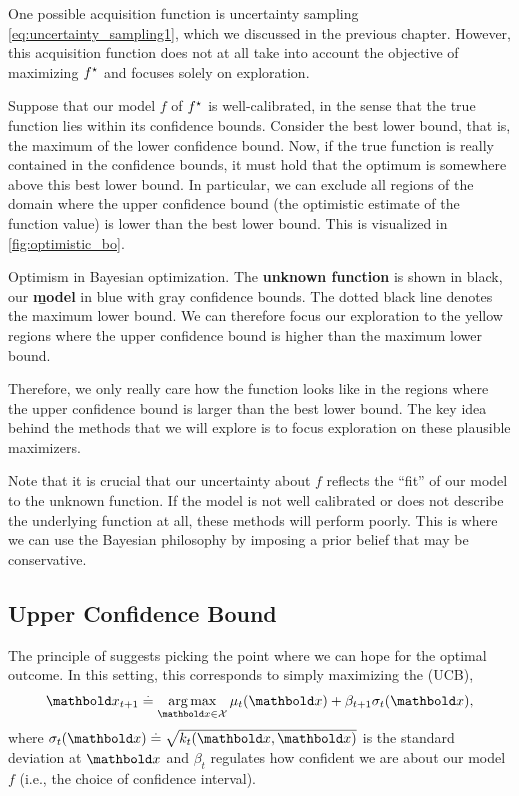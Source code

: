 One possible acquisition function is uncertainty sampling \eqref{eq:uncertainty_sampling1}, which we discussed in the previous chapter.
However, this acquisition function does not at all take into account the objective of maximizing $f^\star$ and focuses solely on exploration.

Suppose that our model $f$ of $f^\star$ is well-calibrated, in the sense that the true function lies within its confidence bounds.
Consider the best lower bound, that is, the maximum of the lower confidence bound.
Now, if the true function is really contained in the confidence bounds, it must hold that the optimum is somewhere above this best lower bound.
In particular, we can exclude all regions of the domain where the upper confidence bound (the optimistic estimate of the function value) is lower than the best lower bound.
This is visualized in \cref{fig:optimistic_bo}.

\begin{marginfigure}
  \caption{Optimism in Bayesian optimization.
  The \textbf{unknown function} is shown in black, our \textbf{\b{model}} in blue with gray confidence bounds.
  The dotted black line denotes the maximum lower bound.
  We can therefore focus our exploration to the yellow regions where the upper confidence bound is higher than the maximum lower bound.}\label{fig:optimistic_bo}
\end{marginfigure}

Therefore, we only really care how the function looks like in the regions where the upper confidence bound is larger than the best lower bound.
The key idea behind the methods that we will explore is to focus exploration on these plausible maximizers.

Note that it is crucial that our uncertainty about $f$ reflects the ``fit'' of our model to the unknown function.
If the model is not well calibrated or does not describe the underlying function at all, these methods will perform poorly.
This is where we can use the Bayesian philosophy by imposing a prior belief that may be conservative.

\subsection{Upper Confidence Bound}\label{sec:bayesian_optimization:acquisition_functions:ucb}

The principle of  suggests picking the point where we can hope for the optimal outcome.
In this setting, this corresponds to simply maximizing the  (UCB), \begin{align}
  \vx_{t+1} \defeq \argmax_{\vx \in \spX} \mu_{t}(\vx) + \beta_{t+1} \sigma_{t}(\vx),
\end{align} where $\sigma_t(\vx) \defeq \sqrt{k_t(\vx, \vx)}$ is the standard deviation at $\vx$ and $\beta_t$ regulates how confident we are about our model $f$ (i.e., the choice of confidence interval).

